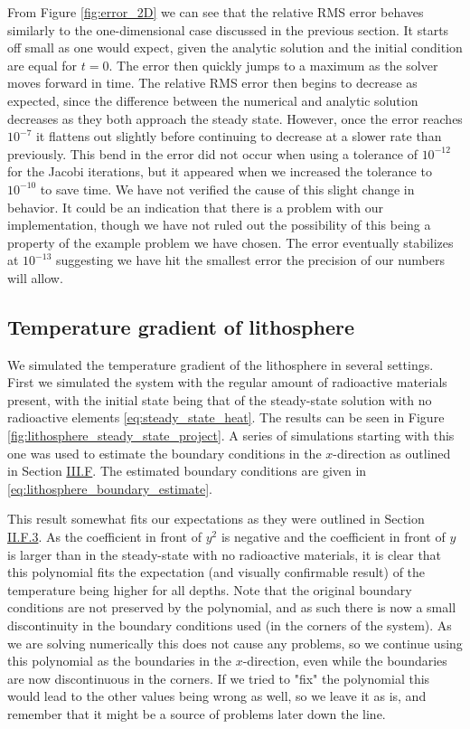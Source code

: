 \documentclass[reprint,english,notitlepage]{revtex4-1}  %
\begin{document}
From Figure \ref{fig:error_2D} we can see that the relative RMS error behaves similarly to the one-dimensional case discussed in the previous section. It starts off small as one would expect, given the analytic solution and the initial condition are equal for \(t=0\). The error then quickly jumps to a maximum as the solver moves forward in time. The relative RMS error then begins to decrease as expected, since the difference between the numerical and analytic solution decreases as they both approach the steady state. However, once the error reaches \(10^{-7}\) it flattens out slightly before continuing to decrease at a slower rate than previously. This bend in the error did not occur when using a tolerance of \(10^{-12}\) for the Jacobi iterations, but it appeared when we increased the tolerance to \(10^{-10}\) to save time. We have not verified the cause of this slight change in behavior. It could be an indication that there is a problem with our implementation, though we have not ruled out the possibility of this being a property of the example problem we have chosen. The error eventually stabilizes at \(10^{-13}\) suggesting we have hit the smallest error the precision of our numbers will allow.


\subsection{Temperature gradient of lithosphere} \label{sec:discussion_lithosphere}

We simulated the temperature gradient of the lithosphere in several settings. First we simulated the system with the regular amount of radioactive materials present, with the initial state being that of the steady-state solution with no radioactive elements \eqref{eq:steady_state_heat}. The results can be seen in Figure \ref{fig:lithosphere_steady_state_project}. A series of simulations starting with this one was used to estimate the boundary conditions in the $x$-direction as outlined in Section \hyperref[sec:method_heat_sim]{III.F}. The estimated boundary conditions are given in \eqref{eq:lithosphere_boundary_estimate}. 

This result somewhat fits our expectations as they were outlined in Section \hyperref[sec:formalism_heat_eq_with_source_term_analytical_sol]{II.F.3}. As the coefficient in front of $y^2$ is negative and the coefficient in front of $y$ is larger than in the steady-state with no radioactive materials, it is clear that this polynomial fits the expectation (and visually confirmable result) of the temperature being higher for all depths. Note that the original boundary conditions are not preserved by the polynomial, and as such there is now a small discontinuity in the boundary conditions used (in the corners of the system). As we are solving numerically this does not cause any problems, so we continue using this polynomial as the boundaries in the $x$-direction, even while the boundaries are now discontinuous in the corners. If we tried to "fix" the polynomial this would lead to the other values being wrong as well, so we leave it as is, and remember that it might be a source of problems later down the line. 
\end{document}
